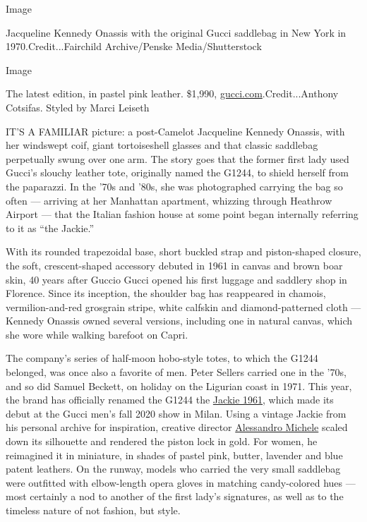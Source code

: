 Image

Jacqueline Kennedy Onassis with the original Gucci saddlebag in New York
in 1970.Credit...Fairchild Archive/Penske Media/Shutterstock

Image

The latest edition, in pastel pink leather. \$1,990,
\href{https://www.gucci.com/us/en/}{gucci.com}.Credit...Anthony
Cotsifas. Styled by Marci Leiseth

IT'S A FAMILIAR picture: a post-Camelot Jacqueline Kennedy Onassis, with
her windswept coif, giant tortoiseshell glasses and that classic
saddlebag perpetually swung over one arm. The story goes that the former
first lady used Gucci's slouchy leather tote, originally named the
G1244, to shield herself from the paparazzi. In the '70s and '80s, she
was photographed carrying the bag so often --- arriving at her Manhattan
apartment, whizzing through Heathrow Airport --- that the Italian
fashion house at some point began internally referring to it as ``the
Jackie.''

With its rounded trapezoidal base, short buckled strap and piston-shaped
closure, the soft, crescent-shaped accessory debuted in 1961 in canvas
and brown boar skin, 40 years after Guccio Gucci opened his first
luggage and saddlery shop in Florence. Since its inception, the shoulder
bag has reappeared in chamois, vermilion-and-red grosgrain stripe, white
calfskin and diamond-patterned cloth --- Kennedy Onassis owned several
versions, including one in natural canvas, which she wore while walking
barefoot on Capri.

The company's series of half-moon hobo-style totes, to which the G1244
belonged, was once also a favorite of men. Peter Sellers carried one in
the '70s, and so did Samuel Beckett, on holiday on the Ligurian coast in
1971. This year, the brand has officially renamed the G1244 the
\href{https://www.gucci.com/us/en/st/capsule/jackie-1961}{Jackie 1961},
which made its debut at the Gucci men's fall 2020 show in Milan. Using a
vintage Jackie from his personal archive for inspiration, creative
director
\href{https://www.nytimes3xbfgragh.onion/2018/10/15/t-magazine/alessandro-michele-gucci-interview.html}{Alessandro
Michele} scaled down its silhouette and rendered the piston lock in
gold. For women, he reimagined it in miniature, in shades of pastel
pink, butter, lavender and blue patent leathers. On the runway, models
who carried the very small saddlebag were outfitted with elbow-length
opera gloves in matching candy-colored hues --- most certainly a nod to
another of the first lady's signatures, as well as to the timeless
nature of not fashion, but style.

